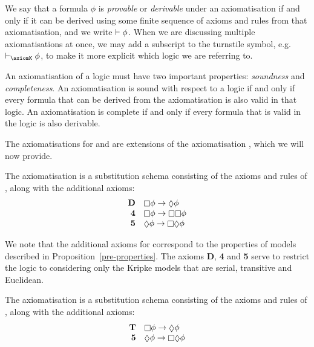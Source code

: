We say that a formula $\phi$ is {\em provable} or {\em derivable} under an
axiomatisation if and only if it can be derived using some finite sequence of
axioms and rules from that axiomatisation, and we write $\vdash \phi$. When we
are discussing multiple axiomatisations at once, we may add a subscript to the
turnstile symbol, e.g. $\proves_\axiomK \phi$, to make it more explicit which
logic we are referring to.

An axiomatisation of a logic must have two important properties: {\em soundness}
and {\em completeness}. An axiomatisation is sound with respect to a logic if
and only if every formula that can be derived from the axiomatisation is also
valid in that logic. An axiomatisation is complete if and only if every formula
that is valid in the logic is also derivable.

The axiomatisations for \logicKD{} and \logicS{} are extensions of the
axiomatisation \axiomK{}, which we will now provide.

\begin{definition}
The axiomatisation \axiomKD{} is a substitution schema consisting of the axioms
and rules of \axiomK{}, along with the additional axioms:
$$
\begin{array}{rl}
{\bf D} & \knows \phi \implies \suspects \phi\\
{\bf 4} & \knows \phi \implies \knows \knows \phi\\
{\bf 5} & \suspects \phi \implies \knows \suspects \phi\\
\end{array}
$$
\end{definition}

We note that the additional axioms for \axiomKD{} correspond to the properties
of \classKD{} models described in Proposition~\ref{pre-properties}. The axioms
{\bf D}, {\bf 4} and {\bf 5} serve to restrict the logic to considering only the
Kripke models that are serial, transitive and Euclidean.


\begin{definition}
The axiomatisation \axiomS{} is a substitution schema consisting of the axioms
and rules of \axiomK{}, along with the additional axioms:
$$
\begin{array}{rl}
{\bf T} & \knows \phi \implies \suspects \phi\\
{\bf 5} & \suspects \phi \implies \knows \suspects \phi\\
\end{array}
$$
\end{definition}

